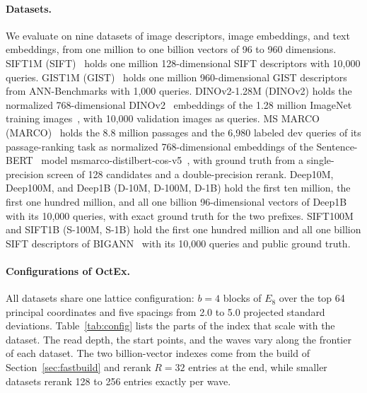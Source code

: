 \documentclass[letterpaper,twocolumn,10pt]{article}
\newcommand{\sysname}{OctEx}
\begin{document}
\paragraph{Datasets.} We evaluate on nine datasets of image descriptors, image embeddings, and text embeddings, from one million to one billion vectors of 96 to 960 dimensions. SIFT1M (SIFT)~\cite{jegou2011bigann,lowe2004sift} holds one million 128-dimensional SIFT descriptors with 10,000 queries. GIST1M (GIST)~\cite{oliva2001gist,aumuller2020annbench} holds one million 960-dimensional GIST descriptors from ANN-Benchmarks with 1,000 queries. DINOv2-1.28M (DINOv2) holds the normalized 768-dimensional DINOv2~\cite{oquab2024dinov2} embeddings of the 1.28 million ImageNet training images~\cite{russakovsky2015ilsvrc}, with 10,000 validation images as queries. MS MARCO (MARCO)~\cite{nguyen2016msmarco} holds the 8.8 million passages and the 6,980 labeled dev queries of its passage-ranking task as normalized 768-dimensional embeddings of the Sentence-BERT~\cite{reimers2019sbert} model msmarco-distilbert-cos-v5~\cite{sanh2019distilbert}, with ground truth from a single-precision screen of 128 candidates and a double-precision rerank. Deep10M, Deep100M, and Deep1B (D-10M, D-100M, D-1B) hold the first ten million, the first one hundred million, and all one billion 96-dimensional vectors of Deep1B~\cite{babenko2016deep} with its 10,000 queries, with exact ground truth for the two prefixes. SIFT100M and SIFT1B (S-100M, S-1B) hold the first one hundred million and all one billion SIFT descriptors of BIGANN~\cite{jegou2011bigann} with its 10,000 queries and public ground truth.

\paragraph{Configurations of \sysname.} All datasets share one lattice configuration: $b = 4$ blocks of $E_8$ over the top 64 principal coordinates and five spacings from 2.0 to 5.0 projected standard deviations. Table~\ref{tab:config} lists the parts of the index that scale with the dataset. The read depth, the start points, and the waves vary along the frontier of each dataset. The two billion-vector indexes come from the build of Section~\ref{sec:fastbuild} and rerank $R = 32$ entries at the end, while smaller datasets rerank 128 to 256 entries exactly per wave.
\end{document}
